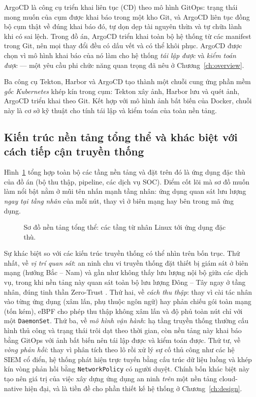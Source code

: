ArgoCD là công cụ triển khai liên tục (CD) theo mô hình GitOps: trạng thái mong muốn của
cụm được khai báo trong một kho Git, và ArgoCD liên tục đồng bộ cụm thật về đúng khai báo
đó, tự dọn dẹp tài nguyên thừa và tự chữa lành khi có sai lệch. Trong đồ án, ArgoCD triển
khai toàn bộ hệ thống từ các manifest trong Git, nên mọi thay đổi đều có dấu vết và có thể
khôi phục. ArgoCD được chọn vì mô hình khai báo của nó làm cho hệ thống \emph{tái lập được}
và \emph{kiểm toán được} --- một yêu cầu phi chức năng quan trọng đã nêu ở
Chương~\ref{ch:overview}.

Ba công cụ Tekton, Harbor và ArgoCD tạo thành một chuỗi cung ứng phần mềm \emph{gốc
Kubernetes} khép kín trong cụm: Tekton xây ảnh, Harbor lưu và quét ảnh, ArgoCD triển khai
theo Git. Kết hợp với mô hình ảnh bất biến của Docker, chuỗi này là cơ sở kỹ thuật cho tính
tái lập và kiểm toán của toàn nền tảng.

\subsection{Kiến trúc nền tảng tổng thể và khác biệt với cách tiếp cận truyền thống}

Hình~\ref{fig:platform} tổng hợp toàn bộ các tầng nền tảng và đặt trên đó là ứng dụng
đặc thù của đồ án (bộ thu thập, pipeline, các dịch vụ SOC). Điểm cốt lõi mà sơ đồ muốn
làm nổi bật nằm ở mũi tên nhấn mạnh tầng nhân: ứng dụng quan sát lưu lượng \emph{ngay
tại tầng nhân} của mỗi nút, thay vì ở biên mạng hay bên trong mã ứng dụng.

\begin{figure}[H]
  \centering
  \resizebox{0.95\linewidth}{!}{}
  \caption{Sơ đồ nền tảng tổng thể: các tầng từ nhân Linux tới ứng dụng đặc thù.}
  \label{fig:platform}
\end{figure}

Sự khác biệt so với các kiến trúc truyền thống có thể nhìn trên bốn trục. Thứ nhất, về
\emph{vị trí quan sát}: an ninh chu vi truyền thống đặt thiết bị giám sát ở biên mạng
(hướng Bắc -- Nam) và gần như không thấy lưu lượng nội bộ giữa các dịch vụ, trong khi
nền tảng này quan sát toàn bộ lưu lượng Đông -- Tây ngay ở tầng nhân, đúng tinh thần
Zero-Trust \cite{nist800207}. Thứ hai, về \emph{cách thu thập}: thay vì cài tác nhân
vào từng ứng dụng (xâm lấn, phụ thuộc ngôn ngữ) hay phản chiếu gói toàn mạng (tốn kém),
eBPF cho phép thu thập không xâm lấn và độ phủ toàn nút chỉ với một \texttt{DaemonSet}.
Thứ ba, về \emph{mô hình vận hành}: hạ tầng truyền thống thường cấu hình thủ công và
trạng thái trôi dạt theo thời gian, còn nền tảng này khai báo bằng GitOps với ảnh bất
biến nên tái lập được và kiểm toán được. Thứ tư, về \emph{vòng phản hồi}: thay vì phân
tích theo lô rồi xử lý sự cố thủ công như các hệ SIEM cổ điển, hệ thống phát hiện trực
tuyến bằng cấu trúc dữ liệu luồng và khép kín vòng phản hồi bằng \texttt{NetworkPolicy}
có người duyệt. Chính bốn khác biệt này tạo nên giá trị của việc xây dựng ứng dụng an
ninh \emph{trên} một nền tảng cloud-native hiện đại, và là tiền đề cho phần thiết kế hệ
thống ở Chương~\ref{ch:design}.

